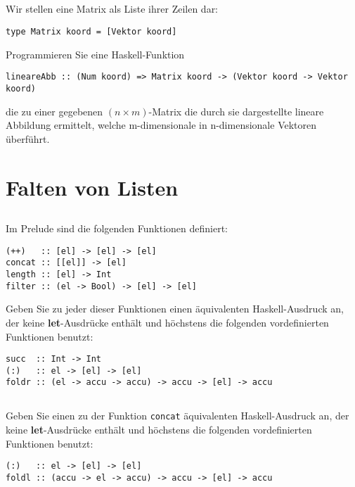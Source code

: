 \documentclass[
  10pt,                   %
  DIV12,
  german,                 %
  oneside,                %
  parskip=half,           %
  headings=normal,        %
  captions=tableheading,  %
]{scrartcl}
\begin{document}
\subsection{}
Wir stellen eine Matrix als Liste ihrer Zeilen dar:
\begin{lstlisting}
type Matrix koord = [Vektor koord]
\end{lstlisting}
Programmieren Sie eine Haskell-Funktion
\begin{lstlisting}
lineareAbb :: (Num koord) => Matrix koord -> (Vektor koord -> Vektor koord)
\end{lstlisting}
die zu einer gegebenen $(n \times m)$-Matrix die durch sie dargestellte lineare Abbildung
ermittelt, welche m-dimensionale in n-dimensionale Vektoren überführt.

\section{Falten von Listen}
\subsection{}
Im Prelude sind die folgenden Funktionen definiert:
\begin{lstlisting}
(++)   :: [el] -> [el] -> [el]
concat :: [[el]] -> [el]
length :: [el] -> Int
filter :: (el -> Bool) -> [el] -> [el]
\end{lstlisting}
Geben Sie zu jeder dieser Funktionen einen äquivalenten Haskell-Ausdruck an,
der keine \textbf{let}-Ausdrücke enthält und höchstens die folgenden vordefinierten
Funktionen benutzt:
\begin{lstlisting}
succ  :: Int -> Int
(:)   :: el -> [el] -> [el]
foldr :: (el -> accu -> accu) -> accu -> [el] -> accu
\end{lstlisting}
\subsection{}
Geben Sie einen zu der Funktion \lstinline|concat| äquivalenten Haskell-Ausdruck an, der keine
\textbf{let}-Ausdrücke enthält und höchstens die folgenden vordefinierten Funktionen
benutzt:
\begin{lstlisting}
(:)   :: el -> [el] -> [el]
foldl :: (accu -> el -> accu) -> accu -> [el] -> accu
\end{lstlisting}
\end{document}
